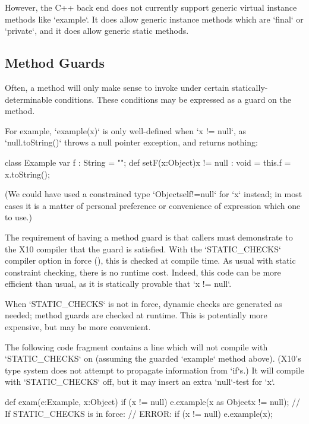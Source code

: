 However, the C++ back end does not currently support generic virtual instance
methods like \xcd`example`.  It does allow generic instance methods which are
\xcd`final` or \xcd`private`, and it does allow generic static methods.  


\subsection{Method Guards}
\label{MethodGuard}

Often, a method will only make sense to invoke under certain
statically-determinable conditions.  These conditions may be expressed as a
guard on the method.

\begin{ex}
For example, \xcd`example(x)` is only
well-defined when \xcd`x != null`, as \xcd`null.toString()` throws a null
pointer exception, and returns nothing: 
% 
\begin{xten}
class Example {
   var f : String = "";
   def setF(x:Object){x != null} : void = {
      this.f = x.toString();
   }
}
\end{xten}
%
\noindent
(We could have used a constrained type \xcd`Object{self!=null}` for \xcd`x`
instead; in
most cases it is a matter of personal preference or convenience of expression
which one to use.) 
\end{ex}


The requirement of having a method guard 
is that callers must demonstrate to
the X10
compiler that the guard is satisfied.  
With the \xcd`STATIC_CHECKS` compiler option in force (), this is
checked at compile time. 
As usual with static constraint
checking, there is no runtime cost.  Indeed, this code can be more efficient
than usual, as it is statically provable that \xcd`x != null`.

When \xcd`STATIC_CHECKS` is not in force, dynamic checks are generated as
needed; method guards are checked at runtime. This is potentially more
expensive, but may be more convenient. 

\begin{ex}
The following code fragment contains a line which will not compile 
with \xcd`STATIC_CHECKS` on (assuming the guarded \xcd`example` method above).  (X10's type system does not attempt to propagate 
information from \xcd`if`s.)  It will compile with \xcd`STATIC_CHECKS` off,
but it may insert an extra \xcd`null`-test for \xcd`x`.  
\begin{xten}
  def exam(e:Example, x:Object) {
    if (x != null) 
       e.example(x as Object{x != null});
       // If STATIC_CHECKS is in force: 
       // ERROR: if (x != null) e.example(x); 
  }
\end{xten}
\end{ex}


